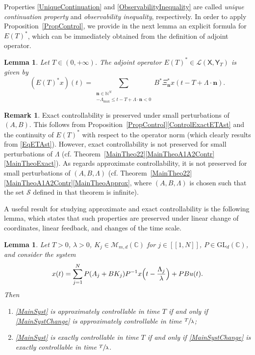 \documentclass[10pt]{article}
\newcommand{\cf}{cf.\xspace}
\newcommand{\bn}{\boldsymbol{n}}
\newcommand{\llbracket}{[\![}
\newcommand{\rrbracket}{]\!]}
\theoremstyle{plain}
\newtheorem{lemm}[theo]{Lemma}
\theoremstyle{definition}
\newtheorem{remk}[theo]{Remark}
\numberwithin{equation}{section}\numberwithin{figure}{section}\emergencystretch=3em
\begin{document}
Properties \eqref{UniqueContinuation} and \eqref{ObservabilityInequality} are called \emph{unique continuation property} and \emph{observability inequality}, respectively. In order to apply Proposition~\ref{PropControl}, we provide in the next lemma an explicit formula for $E(T)^\ast$, which can be immediately obtained from the definition of adjoint operator.

\begin{lemm}
\label{LemmETAdj}
Let $T \in (0, +\infty)$. The adjoint operator $E(T)^\ast \in \mathcal L(\mathsf X, \mathsf Y_T)$ is given by
\begin{equation}
\label{EqETAst}
(E(T)^\ast x)(t) = \sum_{\substack{\bn \in \mathbb N^N \\ -\Lambda_{\max} \leq t - T + \Lambda \cdot \bn < 0}} B^\ast \Xi_{\bn}^\ast x(t - T + \Lambda \cdot \bn).
\end{equation}
\end{lemm}

\begin{remk}
Exact controllability is preserved under small perturbations of $(A, B)$. This follows from Proposition~\ref{PropControl}\eqref{ControlExactETAst} and the continuity of $E(T)^\ast$ with respect to the operator norm (which clearly results from \eqref{EqETAst}). However, exact controllability is not preserved for small perturbations of $\Lambda$ (\cf Theorem~\ref{MainTheo22}\eqref{MainTheoA1A2Contr}\eqref{MainTheoExact}). As regards approximate controllability, it is not preserved for small perturbations of $(A, B, \Lambda)$ (\cf Theorem~\ref{MainTheo22}\eqref{MainTheoA1A2Contr}\eqref{MainTheoApprox}, where $(A, B, \Lambda)$ is chosen such that the set $\mathcal S$ defined in that theorem is infinite).
\end{remk}

A useful result for studying approximate and exact controllability is the following lem\-ma, which states that such properties are preserved under linear change of coordinates, linear feedback, and changes of the time scale.

\begin{lemm}
\label{LemmControlDelayInvariant}
Let $T > 0$, $\lambda > 0$, $K_j \in \mathcal M_{m, d}(\mathbb C)$ for $j \in \llbracket 1, N\rrbracket$, $P \in \mathrm{GL}_d(\mathbb C)$, and consider the system
\begin{equation}
\label{MainSystChange}
x(t) = \sum_{j=1}^N P(A_j + B K_j) P^{-1} x\Bigl(t - \frac{\Lambda_j}{\lambda}\Bigr) + P B u(t).
\end{equation}
Then
\begin{enumerate}
\item\label{ApproxContrlIff} \eqref{MainSyst} is approximately controllable in time $T$ if and only if \eqref{MainSystChange} is approximately controllable in time $\sfrac{T}{\lambda}$;

\item\label{ExactContrlIff} \eqref{MainSyst} is exactly controllable in time $T$ if and only if \eqref{MainSystChange} is exactly controllable in time $\sfrac{T}{\lambda}$.
\end{enumerate}
\end{lemm}
\end{document}
